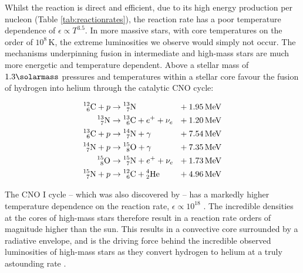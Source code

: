 \noindent
Whilst the reaction is direct and efficient, due to its high energy production per nucleon (Table \ref{tab:reactionrates}), the reaction rate has a poor temperature dependence of $\epsilon \propto T^{3.5}$.
In more massive stars, with core temperatures on the order of $10^8 \, \si{\kelvin}$, the extreme luminosities we observe would simply not occur.
The mechanisms underpinning fusion in intermediate and high-mass stars are much more energetic and temperature dependent.
Above a stellar mass of $1.3 \si{\solarmass}$ pressures and temperatures within a stellar core favour the fusion of hydrogen into helium through the catalytic CNO cycle:

\begin{equation}
  \begin{alignedat}{3}
    \prescript{12}{6}{\text C} + p & \rightarrow \prescript{13}{7}{\text N} && ~~ + \SI{1.95}{\mega\electronvolt} \\ 
    \prescript{13}{7}{\text N} & \rightarrow \prescript{13}{6}{\text C} + e^+ + \nu_e && ~~ + \SI{1.20}{\mega\electronvolt} \\
    \prescript{13}{6}{\text C} + p & \rightarrow \prescript{14}{7}{\text N} + \gamma && ~~ + \SI{7.54}{\mega\electronvolt} \\
    \prescript{14}{7}{\text N} + p & \rightarrow \prescript{15}{8}{\text O} + \gamma && ~~ + \SI{7.35}{\mega\electronvolt} \\
    \prescript{15}{8}{\text O} & \rightarrow \prescript{15}{7}{\text N} + e^+ + \nu_e && ~~ + \SI{1.73}{\mega\electronvolt} \\
    \prescript{15}{7}{\text N} + p & \rightarrow \prescript{12}{6}{\text C} + \prescript{4}{2}{\text {He}} && ~~ + \SI{4.96}{\mega\electronvolt}
  \end{alignedat}
\end{equation}

\noindent
The CNO I cycle -- which was also discovered by \textcite{betheEnergyProductionStars1939} -- has a markedly higher temperature dependence on the reaction rate, $\epsilon \propto 10^{18}$
\parencite[Ch.~10]{wongIntroductoryNuclearPhysics1998}.
The incredible densities at the cores of high-mass stars therefore result in a reaction rate orders of magnitude higher than the sun.
This results in a convective core surrounded by a radiative envelope, and is the driving force behind the incredible observed luminosities of high-mass stars as they convert hydrogen to helium at a truly astounding rate \parencite[Ch.~5]{salarisEvolutionStarsStellar2005}.

